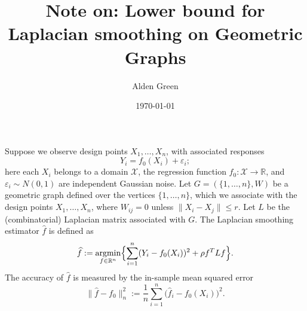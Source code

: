 \documentclass{article}
\newcommand{\Reals}{\mathbb{R}}
\newcommand{\1}{\mathbf{1}}
\DeclareMathOperator*{\argmin}{argmin}
\newcommand{\Lap}{L}
\newcommand{\Xset}{\mathcal{X}}
\newcommand{\wh}[1]{\widehat{#1}}
\theoremstyle{definition}
\theoremstyle{remark}
\begin{document}
\title{Note on: Lower bound for Laplacian smoothing on Geometric Graphs}
\author{Alden Green}
\date{\today}
\maketitle

Suppose we observe design points $X_1,\ldots,X_n$, with associated responses
\begin{equation*}
Y_i = f_0(X_i) + \varepsilon_i;
\end{equation*}
here each $X_i$ belongs to a domain $\Xset$, the regression function $f_0: \Xset \to \Reals$, and $\varepsilon_i \sim N(0,1)$ are independent Gaussian noise. Let $G = (\{1,\ldots,n\},W)$ be a geometric graph defined over the vertices $\{1,\ldots,n\}$, which we associate with the design points $X_1,\ldots,X_n$, where $W_{ij} = 0$ unless $\|X_i - X_j\| \leq r$.  Let $\Lap$ be the (combinatorial) Laplacian matrix associated with $G$. The Laplacian smoothing estimator $\wh{f}$ is defined as
\begin{equation*}
\wh{f} := \argmin_{f \in \Reals^n} \Bigl\{\sum_{i = 1}^{n} (Y_i - f_0(X_i))^2 + \rho f^T \Lap f\Bigr\}.
\end{equation*}
The accuracy of $\wh{f}$ is measured by the in-sample mean squared error
\begin{equation*}
\|\wh{f} - f_0\|_n^2 := \frac{1}{n} \sum_{i = 1}^{n} \bigl(\wh{f}_i - f_0(X_i)\bigr)^2.
\end{equation*}
\end{document}
